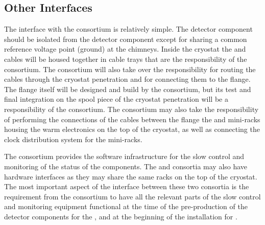 \subsection{Other Interfaces}
\label{sec:fdsp-tpcelec-interfaces-other}

The interface with the  consortium is relatively simple.
The  detector component should be isolated from the 
detector component except for sharing a common reference 
voltage point (ground) at the chimneys. Inside the cryostat the 
 and  cables will be housed together in
cable trays that are the responsibility of the 
consortium. The  consortium will also take over
the responsibility for routing the  cables through the
cryostat penetration and for connecting them to the 
flange. The flange itself will be designed and build by the 
consortium, but its test and final integration on the spool piece
of the cryostat penetration will be a responsibility of the 
consortium. The  consortium may also
take the responsibility of performing the connections of the 
 cables between the flange the and mini-racks housing
the  warm electronics on the top of the cryostat, as
well as connecting the clock distribution system for the mini-racks.

The  consortium provides the software infrastructure for the slow
control and monitoring of the status of the  components.
The  and  consortia may also have hardware
interfaces as they may share the same racks on the top of the
cryostat. The most important aspect of the interface between these
two consortia is the requirement from the  consortium
to have all the relevant parts of the slow control and monitoring
equipment functional at the time of the pre-production of
the detector components for the , and at the beginning
of the installation for \surf. 
